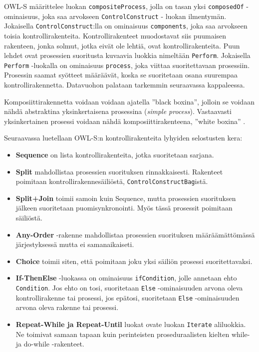\documentclass[finnish]{tktltiki2}
\theoremstyle{definition}
\theoremstyle{remark}
\begin{document}
OWL-S määrittelee luokan \texttt{compositeProcess}, jolla on tasan yksi \texttt{composedOf} -ominaisuus, joka saa arvokseen \texttt{ControlConstruct} - luokan ilmentymän. Jokaisella \texttt{ControlConstruct}:lla on ominaisuus \texttt{components}, joka saa arvokseen toisia kontrollirakenteita\cite{OWLS}. Kontrollirakenteet muodostavat siis puumaisen rakenteen, jonka solmut, jotka eivät ole lehtiä, ovat kontrollirakenteita. Puun lehdet ovat prosessien suoritusta kuvaavia luokkia nimeltään \texttt{Perform}. Jokaisella \texttt{Perform} -luokalla on ominaisuus \texttt{process}, joka viittaa suoritettavaan prosessiin\cite{OWLS}.  Prosessin saamat syötteet määräävät, koska se suoritetaan osana suurempaa kontrollirakennetta. Datavuohon palataan tarkemmin seuraavassa kappaleessa.

Komposiittirakennetta voidaan voidaan ajatella ''black boxina'', jolloin se voidaan nähdä abstraktina yksinkertaisena prosessina (\textit{simple process}). Vastaavasti yksinkertainen prosessi voidaan nähdä komposiittirakenteena, ''white boxina'' \cite{OWLS}. 

Seuraavassa luetellaan OWL-S:n kontrollirakenteita lyhyiden selostusten kera:      
 
 \begin{itemize}
\item \textbf{Sequence} on lista kontrollirakenteita, jotka suoritetaan sarjana. 
\item \textbf{Split} mahdollistaa prosessien suorituksen rinnakkaisesti. Rakenteet poimitaan kontrollirakennesäiliöstä, \texttt{ControlConstructBag}istä.
\item \textbf{Split+Join} toimii samoin kuin Sequence, mutta prosessien suorituksen jälkeen suoritetaan puomisynkronointi. Myös tässä prosessit poimitaan säiliöstä. 
\item \textbf{Any-Order} -rakenne mahdollistaa prosessien suorituksen määräämättömässä järjestyksessä mutta ei samanaikaiseti. 
\item \textbf{Choice} toimii siten, että poimitaan joku yksi säiliön prosessi suoritettavaksi.
\item \textbf{If-ThenElse} -luokassa on ominaisuus \texttt{ifCondition}, jolle annetaan ehto \texttt{Condition}. Jos ehto on tosi, suoritetaan \texttt{Else} -ominaisuuden arvona oleva kontrollirakenne tai prosessi, jos epätosi, suoritetaan \texttt{Else} -ominaisuuden arvona oleva rakenne tai prosessi. 
\item \textbf{Repeat-While ja Repeat-Until} luokat ovate luokan \texttt{Iterate} aliluokkia. Ne toimivat samaan tapaan kuin perinteisten proseduraalisten kielten while- ja do-while -rakenteet.   
\end{itemize}
\end{document}
